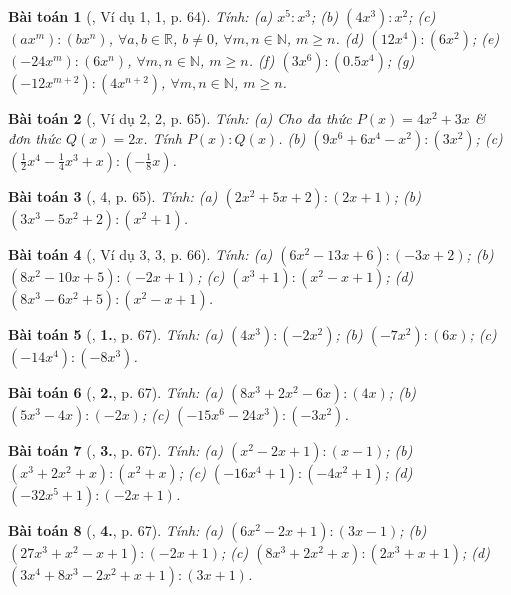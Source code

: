 \documentclass{article}
\numberwithin{equation}{section}
\newtheorem{baitoan}{Bài toán}
\begin{document}
\begin{baitoan}[\cite{SGK_Toan_7_Canh_Dieu_tap_2}, Ví dụ 1, 1, p. 64]
	Tính: (a) $x^5:x^3$; (b) $(4x^3):x^2$; (c) $(ax^m):(bx^n)$, $\forall a,b\in\mathbb{R}$, $b\ne0$, $\forall m,n\in\mathbb{N}$, $m\ge n$. (d) $(12x^4):(6x^2)$; (e) $(-24x^m):(6x^n)$, $\forall m,n\in\mathbb{N}$, $m\ge n$. (f) $(3x^6):(0.5x^4)$; (g) $(-12x^{m+2}):(4x^{n+2})$, $\forall m,n\in\mathbb{N}$, $m\ge n$.
\end{baitoan}

\begin{baitoan}[\cite{SGK_Toan_7_Canh_Dieu_tap_2}, Ví dụ 2, 2, p. 65]
	Tính: (a) Cho đa thức $P(x) = 4x^2 + 3x$ \& đơn thức $Q(x) = 2x$. Tính $P(x):Q(x)$. (b) $(9x^6 + 6x^4 - x^2):(3x^2)$; (c) $\left(\frac{1}{2}x^4 - \frac{1}{4}x^3 + x\right):\left(-\frac{1}{8}x\right)$.
\end{baitoan}

\begin{baitoan}[\cite{SGK_Toan_7_Canh_Dieu_tap_2}, 4, p. 65]
	Tính: (a) $(2x^2 + 5x + 2):(2x + 1)$; (b) $(3x^3 - 5x^2 + 2):(x^2 + 1)$.
\end{baitoan}

\begin{baitoan}[\cite{SGK_Toan_7_Canh_Dieu_tap_2}, Ví dụ 3, 3, p. 66]
	Tính: (a) $(6x^2 - 13x + 6):(-3x + 2)$; (b) $(8x^2 - 10x + 5):(-2x + 1)$; (c) $(x^3 + 1):(x^2 - x + 1)$; (d) $(8x^3 - 6x^2 + 5):(x^2 - x + 1)$.
\end{baitoan}

\begin{baitoan}[\cite{SGK_Toan_7_Canh_Dieu_tap_2}, \textbf{1.}, p. 67]
	Tính: (a) $(4x^3):(-2x^2)$; (b) $(-7x^2):(6x)$; (c) $(-14x^4):(-8x^3)$.
\end{baitoan}

\begin{baitoan}[\cite{SGK_Toan_7_Canh_Dieu_tap_2}, \textbf{2.}, p. 67]
	Tính: (a) $(8x^3 + 2x^2 - 6x):(4x)$; (b) $(5x^3 - 4x):(-2x)$; (c) $(-15x^6 - 24x^3):(-3x^2)$.
\end{baitoan}

\begin{baitoan}[\cite{SGK_Toan_7_Canh_Dieu_tap_2}, \textbf{3.}, p. 67]
	Tính: (a) $(x^2 - 2x + 1):(x - 1)$; (b) $(x^3 + 2x^2 + x):(x^2 + x)$; (c) $(-16x^4 + 1):(-4x^2 + 1)$; (d) $(-32x^5 + 1):(-2x + 1)$.
\end{baitoan}

\begin{baitoan}[\cite{SGK_Toan_7_Canh_Dieu_tap_2}, \textbf{4.}, p. 67]
	Tính: (a) $(6x^2 - 2x + 1):(3x - 1)$; (b) $(27x^3 + x^2 - x + 1):(-2x + 1)$; (c) $(8x^3 + 2x^2 + x):(2x^3 + x + 1)$; (d) $(3x^4 + 8x^3 - 2x^2 + x + 1):(3x + 1)$.
\end{baitoan}
\end{document}
